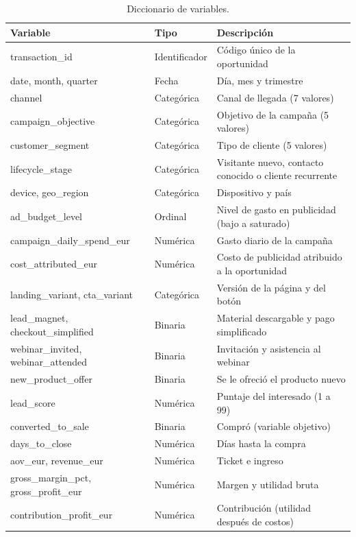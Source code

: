 \documentclass[11pt,letterpaper]{article}
\newcommand{\encabezado}{\rowcolor{mcicCian!15}}
\begin{document}
\begin{table}[H]
\centering\small
\caption{Diccionario de variables.}
\begin{tabularx}{\linewidth}{>{\ttfamily}l l L}
\toprule
\encabezado \normalfont Variable & Tipo & Descripción \\
\midrule
transaction\_id & Identificador & Código único de la oportunidad \\
date, month, quarter & Fecha & Día, mes y trimestre \\
channel & Categórica & Canal de llegada (7 valores) \\
campaign\_objective & Categórica & Objetivo de la campaña (5 valores) \\
customer\_segment & Categórica & Tipo de cliente (5 valores) \\
lifecycle\_stage & Categórica & Visitante nuevo, contacto conocido o cliente recurrente \\
device, geo\_region & Categórica & Dispositivo y país \\
ad\_budget\_level & Ordinal & Nivel de gasto en publicidad (bajo a saturado) \\
campaign\_daily\_spend\_eur & Numérica & Gasto diario de la campaña \\
cost\_attributed\_eur & Numérica & Costo de publicidad atribuido a la oportunidad \\
landing\_variant, cta\_variant & Categórica & Versión de la página y del botón \\
lead\_magnet, checkout\_simplified & Binaria & Material descargable y pago simplificado \\
webinar\_invited, webinar\_attended & Binaria & Invitación y asistencia al webinar \\
new\_product\_offer & Binaria & Se le ofreció el producto nuevo \\
lead\_score & Numérica & Puntaje del interesado (1 a 99) \\
converted\_to\_sale & Binaria & Compró (variable objetivo) \\
days\_to\_close & Numérica & Días hasta la compra \\
aov\_eur, revenue\_eur & Numérica & Ticket e ingreso \\
gross\_margin\_pct, gross\_profit\_eur & Numérica & Margen y utilidad bruta \\
contribution\_profit\_eur & Numérica & Contribución (utilidad después de costos) \\
\bottomrule
\end{tabularx}
\end{table}
\end{document}
